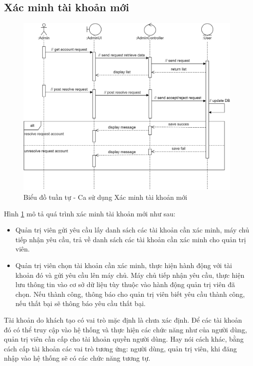 \documentclass[./../main.tex]{subfiles}
\begin{document}
\subsection{Xác minh tài khoản mới}
\begin{figure}[H]
	\centering
	\includegraphics[width=\linewidth]{./img/uc20.png}
	\caption{\label{tab:seq-uc12}Biểu đồ tuần tự - Ca sử dụng Xác minh tài khoản mới}
\end{figure}
Hình \ref{tab:seq-uc12} mô tả quá trình xác minh tài khoản mới như sau:
\begin{itemize}
    \item Quản trị viên gửi yêu cầu lấy danh sách các tài khoản cần xác minh, máy chủ tiếp nhận yêu cầu, trả về danh sách các tài khoản cần xác minh cho quản trị viên.
    \item Quản trị viên chọn tài khoản cần xác minh, thực hiện hành động với tài khoản đó và gửi yêu cầu lên máy chủ. Máy chủ tiếp nhận yêu cầu, thực hiện lưu thông tin vào cơ sở dữ liệu tùy thuộc vào hành động quản trị viên đã chọn. Nếu thành công, thông báo cho quản trị viên biết yêu cầu thành công, nếu thất bại sẽ thông báo yêu cầu thất bại.
\end{itemize}

Tài khoản do khách tạo có vai trò mặc định là chưa xác định. Để các tài khoản đó có thể truy cập vào hệ thống và thực hiện các chức năng như của người dùng, quản trị viên cần cấp cho tài khoản quyền người dùng. Hay nói cách khác, bằng cách cấp tài khoản các vai trò tương ứng: người dùng, quản trị viên, khi đăng nhập vào hệ thống sẽ có các chức năng tương tự.
\end{document}
